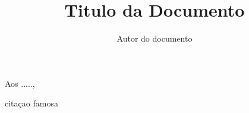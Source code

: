 \documentclass[12pt,a4paper,twoside]{report}
\begin{document}
\title{Titulo da Documento}
\author{Autor do documento}
\authnum{}
\secondauthor{\mbox{}}
\secauthnum{\mbox{}}

\beforepreface

\hfill Aos .....,


\newpage
\mbox{}

\hfill citaçao famosa



\newpage
\mbox{}





\newpage
\mbox{}



\afterpreface

\end{document}
